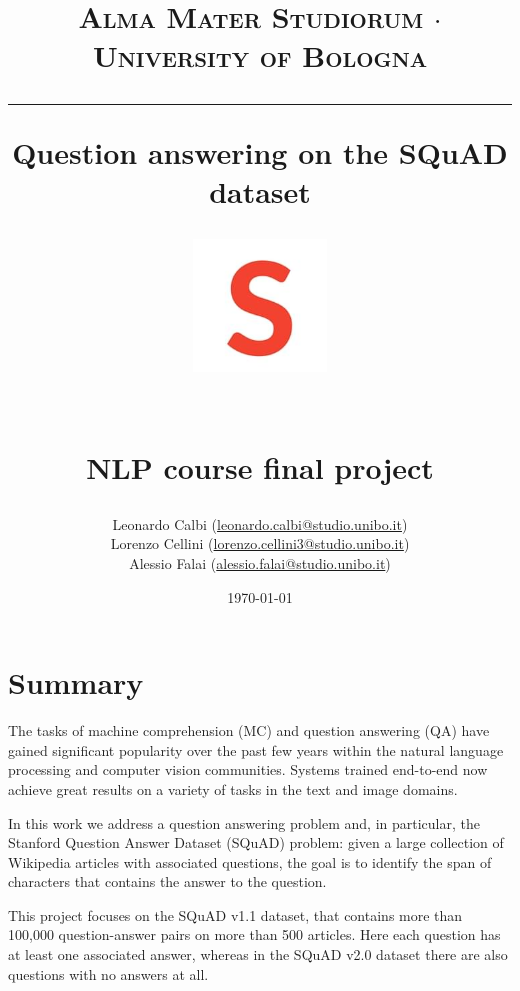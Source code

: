 \documentclass[a4paper,10pt]{report}
\begin{document}
\frenchspacing

\title{
	{{\large{\textsc{Alma Mater Studiorum $\cdot$ University of Bologna}}}}
	\rule{\textwidth}{0.4pt}\vspace{3mm}
	\textbf{Question answering on the SQuAD dataset}
	\begin{figure}[!htb]
		\centering
		\includegraphics[width = 100pt]{squad-logo}
	\end{figure} \\
	NLP course final project
}

\author{Leonardo Calbi (\href{mailto:leonardo.calbi@studio.unibo.it}{leonardo.calbi@studio.unibo.it}) \\ Lorenzo Cellini (\href{mailto:lorenzo.cellini3@studio.unibo.it}{lorenzo.cellini3@studio.unibo.it}) \\ Alessio Falai (\href{mailto:alessio.falai@studio.unibo.it}{alessio.falai@studio.unibo.it})}
\date{\today}
\maketitle
\newpage
\tableofcontents
\setcounter{tocdepth}{1}
\newpage


\chapter{Summary}\label{chap:introduction}

The tasks of machine comprehension (MC) and question answering (QA) have gained significant popularity over the past few years within the natural language processing and computer vision communities. Systems trained end-to-end now achieve great results on a variety of tasks in the text and image domains.

In this work we address a question answering problem and, in particular, the Stanford Question Answer Dataset (SQuAD) problem: given a large collection of Wikipedia articles with associated questions, the goal is to identify the span of characters that contains the answer to the question.

This project focuses on the SQuAD v1.1 dataset, that contains more than 100,000 question-answer pairs on more than 500 articles. Here each question has at least one associated answer, whereas in the SQuAD v2.0 dataset there are also questions with no answers at all.
\end{document}
